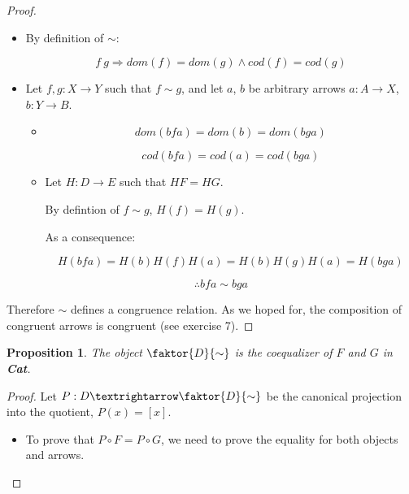 \documentclass{article}
\newtheorem{proposition}{Proposition}
\begin{document}
\begin{enumerate}
\begin{proof}
\begin{itemize}
          \item By definition of $\sim$:

            $$f ~ g \Rightarrow dom(f) = dom(g) \wedge cod(f) = cod(g)$$ 

        \item
          Let $f , g : X → Y$ such that $f \sim g$, and let $a$, $b$ be arbitrary
          arrows $a : A → X$, $b : Y → B$.

          \begin{itemize}

           \item

               $$dom(bfa) = dom(b) = dom(bga)$$
             
               $$cod(bfa) = cod(a) = cod(bga)$$

            \item
              
              Let $H : D → E$ such that $HF = HG$.

              By defintion of $f \sim g$, $H(f) = H(g)$.

              As a consequence:

              $$H(bfa) = H(b)H(f)H(a) = H(b)H(g)H(a) = H(bga)$$
              
          \end{itemize}

          $$ \therefore bfa \sim bga $$
    \end{itemize}

    Therefore $\sim$ defines a congruence relation. As we hoped for,
    the composition of congruent arrows is congruent (see exercise 7).

    \end{proof}

    \begin{proposition}
    The object $\faktor{D}{\sim}$ is the coequalizer of $F$ and
    $G$ in {\bf Cat}.
    \end{proposition}

    \begin{proof}

       Let $P : D → \faktor{D}{\sim}$ be the canonical projection
       into the quotient, $P(x) = [x]$.

       \begin{itemize}

         \item To prove that $P \circ F = P \circ G$, we need to prove
           the equality for both objects and arrows.
           

\end{itemize}
\end{proof}
\end{enumerate}
\end{document}
